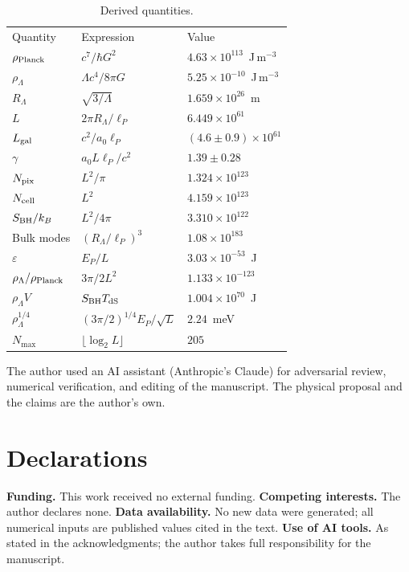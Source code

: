 \documentclass[aps,prd,twocolumn,superscriptaddress,nofootinbib,showkeys]{revtex4-2}
\begin{document}
\begin{table}[htbp]
\caption{Derived quantities.}
\begin{ruledtabular}
\begin{tabular}{lll}
Quantity & Expression & Value \\
\colrule
$\rho_{\rm Planck}$ & $c^7/\hbar G^2$ & $4.63\times10^{113}$~J\,m$^{-3}$ \\
$\rho_\Lambda$ & $\Lambda c^4/8\pi G$ & $5.25\times10^{-10}$~J\,m$^{-3}$ \\
$R_\Lambda$ & $\sqrt{3/\Lambda}$ & $1.659\times10^{26}$~m \\
$L$ & $2\pi R_\Lambda/\ell_P$ & $6.449\times10^{61}$ \\
$L_{\rm gal}$ & $c^2/a_0\ell_P$ & $(4.6\pm0.9)\times10^{61}$ \\
$\gamma$ & $a_0L\ell_P/c^2$ & $1.39\pm0.28$ \\
$N_{\rm pix}$ & $L^2/\pi$ & $1.324\times10^{123}$ \\
$N_{\rm cell}$ & $L^2$ & $4.159\times10^{123}$ \\
$S_{\rm BH}/k_B$ & $L^2/4\pi$ & $3.310\times10^{122}$ \\
Bulk modes & $(R_\Lambda/\ell_P)^3$ & $1.08\times10^{183}$ \\
$\varepsilon$ & $E_P/L$ & $3.03\times10^{-53}$~J \\
$\rho_\Lambda/\rho_{\rm Planck}$ & $3\pi/2L^2$ & $1.133\times10^{-123}$ \\
$\rho_\Lambda V$ & $S_{\rm BH}T_{\rm dS}$ & $1.004\times10^{70}$~J \\
$\rho_\Lambda^{1/4}$ & $(3\pi/2)^{1/4}E_P/\sqrt{L}$ & $2.24$~meV \\
$N_{\max}$ & $\lfloor\log_2 L\rfloor$ & $205$ \\
\end{tabular}
\end{ruledtabular}
\end{table}

\begin{acknowledgments}
The author used an AI assistant (Anthropic's Claude) for adversarial review, numerical verification, and editing of the manuscript. The physical proposal and the claims are the author's own.
\end{acknowledgments}

\section*{Declarations}

\textbf{Funding.} This work received no external funding. \textbf{Competing interests.} The author declares none. \textbf{Data availability.} No new data were generated; all numerical inputs are published values cited in the text. \textbf{Use of AI tools.} As stated in the acknowledgments; the author takes full responsibility for the manuscript.
\end{document}
